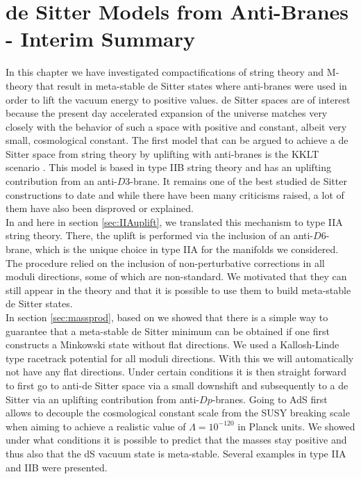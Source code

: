 \documentclass[a4paper,12pt]{report}
\begin{document}
\section{de Sitter Models from Anti-Branes - Interim Summary}
In this chapter we have investigated compactifications of string theory and M-theory that result in meta-stable de Sitter states where anti-branes were used in order to lift the vacuum energy to positive values. de Sitter spaces are of interest because the present day accelerated expansion of the universe matches very closely with the behavior of such a space with positive and constant, albeit very small, cosmological constant. The first model that can be argued to achieve a de Sitter space from string theory by uplifting with anti-branes is the KKLT scenario \cite{Kachru:2003aw,Kachru:2003sx}. This model is based in type IIB string theory and has an uplifting contribution from an anti-$D3$-brane. It remains one of the best studied de Sitter constructions to date and while there have been many criticisms raised, a lot of them have also been disproved or explained.\\
In \cite{Cribiori:2019bfx} and here in section \ref{sec:IIAuplift}, we translated this mechanism to type IIA string theory. There, the uplift is performed via the inclusion of an anti-$D6$-brane, which is the unique choice in type IIA for the manifolds we considered. The procedure relied on the inclusion of non-perturbative corrections in all moduli directions, some of which are non-standard. We motivated that they can still appear in the theory and that it is possible to use them to build meta-stable de Sitter states.\\
In section \ref{sec:massprod}, based on \cite{Kallosh:2019zgd,Cribiori:2019drf} we showed that there is a simple way to guarantee that a meta-stable de Sitter minimum can be obtained if one first constructs a Minkowski state without flat directions. We used a Kallosh-Linde type racetrack potential for all moduli directions. With this we will automatically not have any flat directions. Under certain conditions it is then straight forward to first go to anti-de Sitter space via a small downshift and subsequently to a de Sitter via an uplifting contribution from anti-$Dp$-branes. Going to AdS first allows to decouple the cosmological constant scale from the SUSY breaking scale when aiming to achieve a realistic value of $\Lambda = 10^{-120}$ in Planck units. We showed under what conditions it is possible to predict that the masses stay positive and thus also that the dS vacuum state is meta-stable. Several examples in type IIA and IIB were presented.\\
\end{document}
